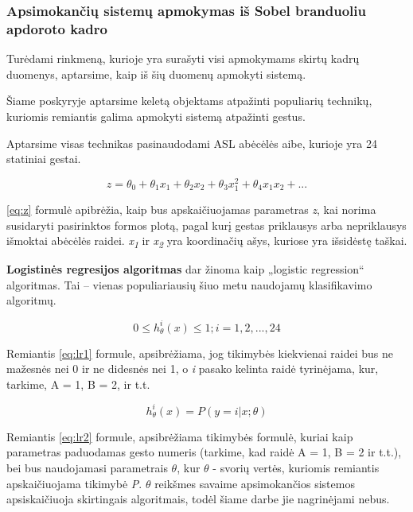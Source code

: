 \documentclass{VUMIFInfKursinis}
\begin{document}
\subsubsection{Apsimokančių sistemų apmokymas iš Sobel branduoliu apdoroto kadro}
Turėdami rinkmeną, kurioje yra surašyti visi apmokymams skirtų kadrų duomenys, aptarsime, kaip iš šių duomenų apmokyti sistemą.

Šiame poskyryje aptarsime keletą objektams atpažinti populiarių technikų, kuriomis remiantis galima apmokyti sistemą atpažinti gestus.

Aptarsime visas technikas pasinaudodami ASL abėcėlės aibe, kurioje yra 24 statiniai gestai.

\begin{equation}\label{eq:z}
	z = \theta_0+\theta_1x_1+\theta_2x_2+\theta_3x_1^2+\theta_4x_1x_2+...
\end{equation}

\ref{eq:z} formulė apibrėžia, kaip bus apskaičiuojamas parametras \textit{z}, kai norima susidaryti pasirinktos formos plotą, pagal kurį gestas priklausys arba nepriklausys išmoktai abėcėlės raidei. \textit{x\textsubscript{1}} ir \textit{x\textsubscript{2}} yra koordinačių ašys, kuriose yra išsidėstę taškai.


\textbf{Logistinės regresijos algoritmas} dar žinoma kaip „logistic regression“ algoritmas. Tai – vienas populiariausių šiuo metu naudojamų klasifikavimo algoritmų.

\begin{equation}\label{eq:lr1}
	0 \leq h_\theta^i(x) \leq 1; i = 1, 2, ..., 24
\end{equation}

Remiantis \ref{eq:lr1} formule, apsibrėžiama, jog tikimybės kiekvienai raidei bus ne mažesnės nei 0 ir ne didesnės nei 1, o \textit{i} pasako kelinta raidė tyrinėjama, kur, tarkime, A = 1, B = 2, ir t.t.

\begin{equation}\label{eq:lr2}
	h_\theta^i(x) = P(y=i | x; \theta)
\end{equation}

Remiantis \ref{eq:lr2} formule, apsibrėžiama tikimybės formulė, kuriai kaip parametras paduodamas gesto numeris (tarkime, kad raidė A = 1, B = 2 ir t.t.), bei bus naudojamasi parametrais $\theta$, kur  $\theta$ - svorių vertės, kuriomis remiantis apskaičiuojama tikimybė 
\textit{P}. $\theta$ reikšmes savaime apsimokančios sistemos apsiskaičiuoja skirtingais algoritmais, todėl šiame darbe jie nagrinėjami nebus.
\end{document}
